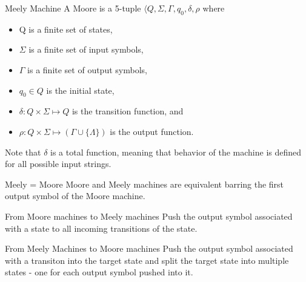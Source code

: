 \documentclass{beamer}
\begin{document}
\begin{frame}{Meely Machine}
A Moore is a 5-tuple $\langle Q, \Sigma, \Gamma, q_0, \delta, \rho$ where
\begin{itemize}
  \item Q is a finite set of states,
  \item $\Sigma$ is a finite set of input symbols,
  \item $\Gamma$ is a finite set of output symbols,
  \item $q_0\in Q$ is  the initial state,
  \item $\delta:Q\times \Sigma\mapsto Q$ is the transition function, and 
  \item $\rho:Q\times\Sigma\mapsto (\Gamma\cup\{\Lambda\})$ is  the output function.
\end{itemize}
Note that $\delta$ is a total function,
meaning that behavior of the machine is defined
for all possible input strings. 
\end{frame}

\begin{frame}{Meely = Moore}
Moore and Meely machines are equivalent barring the first output symbol of the Moore machine. 
\end{frame}

\begin{frame}{From Moore machines to Meely machines} 
Push the output symbol associated with a state to all incoming transitions of the state.  

\end{frame}


\begin{frame}{From Meely Machines to Moore machines}
Push the output symbol associated with a transiton into the target state 
and split the target state into multiple states 
- one for each output symbol pushed into it. 

\end{frame}
\end{document}

